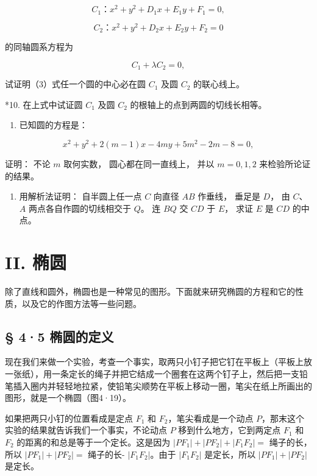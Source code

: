 \[
C_{1}\text{：} x^{2} + y^{2} + D_{1} x + E_{1} y + F_{1} = 0, \tag {1}
\]

\[
C_{2}\text{：} x^{2} + y^{2} + D_{2} x + E_{2} y + F_{2} = 0 \tag {2}
\]

的同轴圆系方程为

\[
C_{1} + \lambda C_{2} = 0, \tag {3}
\]

试证明（3）式任一个圆的中心必在圆 \(C_1\) 及圆 \(C_2\) 的联心线上。

*10. 在上式中试证圆 \(C_1\) 及圆 \(C_2\)
的根轴上的点到两圆的切线长相等。

\begin{enumerate}
\def\labelenumi{\arabic{enumi}.}
\setcounter{enumi}{10}
\tightlist
\item
  已知圆的方程是：
\end{enumerate}

\[
x^{2} + y^{2} + 2 (m - 1) x - 4 m y + 5 m^{2} - 2 m - 8 = 0,
\]

证明： 不论 \(m\) 取何实数， 圆心都在同一直线上， 并以 \(m = 0, 1, 2\)
来检验所论证的结果。

\begin{enumerate}
\def\labelenumi{\arabic{enumi}.}
\setcounter{enumi}{11}
\tightlist
\item
  用解析法证明： 自半圆上任一点 \(C\) 向直径 \(AB\) 作垂线， 垂足是
  \(D\)， 由 \(C\)、\(A\) 两点各自作圆的切线相交于 \(Q\)。 连 \(BQ\) 交
  \(CD\) 于 \(E\)， 求证 \(E\) 是 \(CD\) 的中点。
\end{enumerate}

\section{II. 椭圆}\label{ii.-ux692dux5706}

除了直线和圆外，椭圆也是一种常见的图形。下面就来研究椭圆的方程和它的性质，以及它的作图方法等一些问题。

\subsection{§ 4·5 椭圆的定义}\label{ux692dux5706ux7684ux5b9aux4e49}

现在我们来做一个实验，考查一个事实，取两只小钉子把它钉在平板上（平板上放一张纸），用一条定长的绳子并把它结成一个圈套在这两个钉子上，然后把一支铅笔插入圈内并轻轻地拉紧，使铅笔尖顺势在平板上移动一圈，笔尖在纸上所画出的图形，就是一个椭圆（图4·19）。

如果把两只小钉的位置看成是定点 \(F_{1}\) 和
\(F_{2}\)，笔尖看成是一个动点
\(P\)，那末这个实验的结果就告诉我们一个事实，不论动点 \(P\)
移到什么地方，它到两定点 \(F_{1}\) 和 \(F_{2}\)
的距离的和总是等于一个定长。这是因为
\(|PF_{1}| + |PF_{2}| + |F_{1}F_{2}| =\) 绳子的长，所以
\(|PF_{1}| + |PF_{2}| =\) 绳子的长- \(|F_{1}F_{2}|\)。由于
\(|F_{1}F_{2}|\) 是定长，所以 \(|PF_{1}| + |PF_{2}|\) 是定长。


